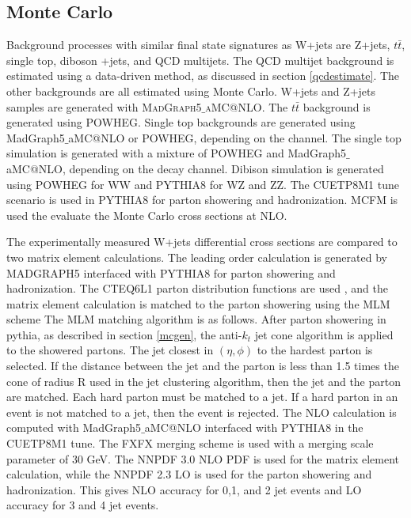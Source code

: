 \documentclass[oneside, letterpaper, oldfontcommands]{memoir}
\begin{document}
\subsection{Monte Carlo}
\qquad Background processes with similar final state signatures as W+jets are Z+jets, $t\bar{t}$, single top, diboson +jets, and QCD multijets. The QCD multijet background is estimated using a data-driven method, as discussed in section \ref{qcdestimate}. The other backgrounds are all estimated using Monte Carlo. W+jets and Z+jets samples are generated with \textsc{{\sc MadGraph5$\_$aMC@NLO}}. 
The $t\bar{t}$ background is generated using POWHEG. Single top backgrounds are generated using {\sc MadGraph5$\_$aMC@NLO} or POWHEG, depending on the channel. 
The single top simulation is generated with a mixture of POWHEG and {\sc MadGraph5$\_$aMC@NLO}, depending on the decay channel. Dibison simulation is generated using POWHEG for WW and PYTHIA8 for WZ and ZZ. The CUETP8M1\cite{Khachatryan:2015pea} tune scenario is used in PYTHIA8 for parton showering and hadronization. MCFM is used the evaluate the Monte Carlo cross sections at NLO. 

\qquad The experimentally measured W+jets differential cross sections are compared to two matrix element calculations. The leading order calculation is generated by MADGRAPH5 interfaced with PYTHIA8 for parton showering and hadronization. The CTEQ6L1 parton distribution functions are used \cite{Manohar:2012pe}, and the matrix element calculation is matched to the parton showering using the MLM scheme \cite{Alwall:2008qv}\cite{Alwall:2007fs} The MLM matching algorithm is as follows. After parton showering in pythia, as described in section \ref{mcgen}, the anti-$k_{t}$ jet cone algorithm is applied to the showered partons. The jet closest in $(\eta, \phi)$ to the hardest parton is selected. If the distance between the jet and the parton is less than 1.5 times the cone of radius R used in the jet clustering algorithm, then the jet and the parton are matched. Each hard parton must be matched to a jet. If a hard parton in an event is not matched to a jet, then the event is rejected. The NLO calculation is computed with {\sc MadGraph5$\_$aMC@NLO} interfaced with PYTHIA8 in the CUETP8M1 tune. The FXFX merging scheme \cite{Frederix:2012ps} is used with a merging scale parameter of 30 GeV. The NNPDF 3.0 NLO PDF \cite{Ball:2014uwa} is used for the matrix element calculation, while the NNPDF 2.3 LO \cite{Ball:2010de}\cite{Ball:2011mu} is used for the parton showering and hadronization. This gives NLO accuracy for 0,1, and 2 jet events and LO accuracy for 3 and 4 jet events. 
\end{document}
